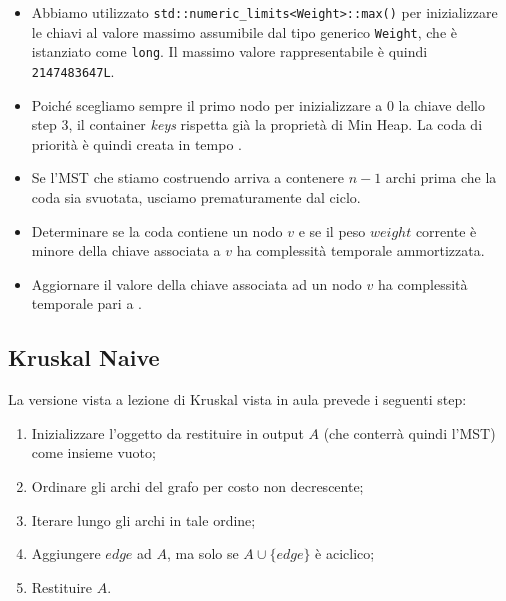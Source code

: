 \begin{itemize}
    \item Abbiamo utilizzato \texttt{std::numeric_limits<Weight>::max()} per inizializzare le chiavi al valore massimo assumibile dal tipo generico \texttt{Weight}, che è istanziato come \texttt{long}. Il massimo valore rappresentabile è quindi \texttt{2147483647L}. \\

    \item Poiché scegliamo sempre il primo nodo per inizializzare a 0 la chiave dello step 3, il container \textit{keys} rispetta già la proprietà di Min Heap. La coda di priorità è quindi creata in tempo \complexityConstant{}. \\

    \item Se l'MST che stiamo costruendo arriva a contenere $n - 1$ archi prima che la coda sia svuotata, usciamo prematuramente dal ciclo. \\

    \item Determinare se la coda contiene un nodo $v$ e se il peso $weight$ corrente è minore della chiave associata a $v$ ha complessità temporale \complexityConstant{} ammortizzata.\\

    \item Aggiornare il valore della chiave associata ad un nodo $v$ ha complessità temporale pari a \complexityLogN{}.\\
\end{itemize}


\subsection{Kruskal Naive}

La versione vista a lezione di Kruskal vista in aula prevede i seguenti step:

\begin{enumerate}
    \item Inizializzare l'oggetto da restituire in output $A$ (che conterrà quindi l'MST) come insieme vuoto;
    \item Ordinare gli archi del grafo per costo non decrescente;
    \item Iterare lungo gli archi in tale ordine;
    \item Aggiungere $edge$ ad $A$, ma solo se $A \cup \{ edge \}$ è aciclico;
    \item Restituire $A$.
\end{enumerate}

